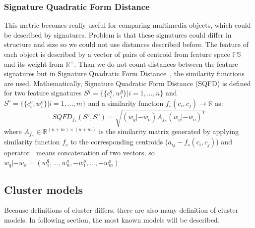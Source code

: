 \subsubsection{Signature Quadratic Form Distance}
This metric becomes really useful for comparing multimedia objects, which could be described by signatures. Problem is that these signatures could differ in structure and size so we could not use distances described before. The feature of each object is described by a vector of pairs of centroid from feature space $\mathbb{FS}$ and its weight from $\mathbb{R^{+}}$.
Than we do not count distances between the feature signatures but in Signature Quadratic Form Distance~\cite{Beecks10}, the similarity functions are used.
Mathematically, Signature Quadratic Form Distance (SQFD) is defined for two feature signatures $S^{q} = \{\{c_i^q, w_i^q\}|i=1,...,n\}$ and $S^{o} = \{\{c_i^o, w_i^o\}|i=1,...,m\}$ and a similarity function $f_s(c_i,c_j) \to \mathbb{R}$ as:
$$SQFD_{f_s}(S^q,S^o)=\sqrt{(w_q|-w_o)A_{f_n}(w_q|-w_o)^T}$$
where $A_{f_n} \in \mathbb{R}^{(n+m)\times(n+m)}$ is the similarity matrix generated by applying similarity function $f_s$ to the corresponding centroids ($a_{ij}-f_s(c_i,c_j)$) and operator $|$ means concatenation of two vectors, so $w_q|-w_o = (w_1^q,...,w_n^q,-w_1^o,...,-w_m^o)$


\subsection{Cluster models}
Because definitions of cluster differs, there are also many definition of cluster models. In following section, the most known models will be described.

